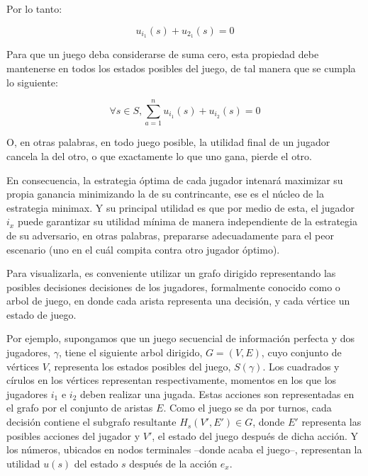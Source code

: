 Por lo tanto:

\begin{equation}
u_{i_{1}}(s)+u_{2_{1}}(s) = 0
\end{equation}

Para que un juego deba considerarse de suma cero, esta propiedad debe mantenerse en todos los estados posibles del juego, de tal manera que se cumpla lo siguiente:

\begin{equation}
\forall s \in S, \sum_{a=1}^{n}{u_{i_{1}}(s)}+{u_{i_{2}}(s)}=0
\end{equation}

O, en otras palabras, en todo juego posible, la utilidad final de un jugador cancela la del otro, o que exactamente lo que uno gana, pierde el otro.

En consecuencia, la estrategia óptima de cada jugador intenará maximizar su propia ganancia minimizando la de su contrincante, ese es el núcleo de la estrategia minimax. Y su principal utilidad es que por medio de esta, el jugador $i_{x}$ puede garantizar su utilidad mínima de manera independiente de la estrategia de su adversario, en otras palabras, prepararse adecuadamente para el peor escenario (uno en el cuál compita contra otro jugador óptimo).

Para visualizarla, es conveniente utilizar un grafo dirigido representando las posibles decisiones decisiones de los jugadores, formalmente conocido como o arbol de juego, en donde cada arista representa una decisión, y cada vértice un estado de juego. 


Por ejemplo, supongamos que un juego secuencial de información perfecta y  dos jugadores, $\gamma$, tiene el siguiente arbol dirigido, $G = (V,E)$, cuyo conjunto de vértices $V$, representa los  estados posibles del juego, $S(\gamma)$. Los cuadrados y círulos en los vértices representan respectivamente, momentos en los  que los jugadores $i_{1}$ e $i_{2}$ deben realizar una jugada. 
Estas acciones son representadas en el grafo por el conjunto de aristas $E$. Como el juego se da por turnos, cada decisión contiene el subgrafo resultante $H_{s}(V',E') \in G$, donde $E'$ representa las posibles acciones del jugador y $V'$, el estado del juego después de dicha acción. Y los números, ubicados en nodos terminales --donde acaba el juego--, representan la utilidad $u(s)$ del estado $s$ después de la acción $e_{x}$. 


